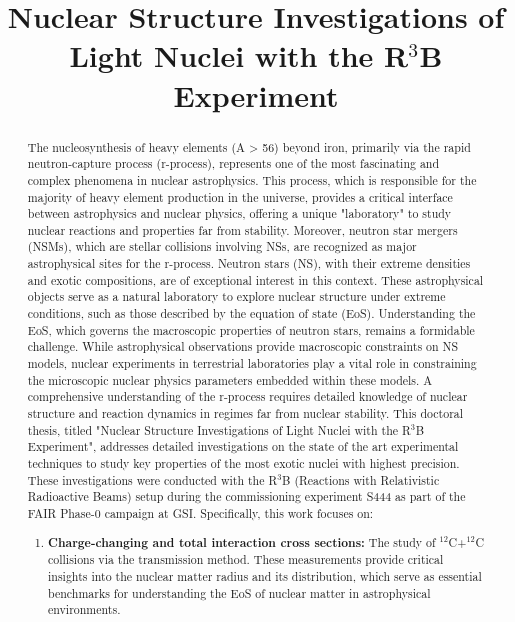 \documentclass[12pt, a4paper]{article}
\date{}
\title{\vspace{-5cm}Nuclear Structure Investigations of Light Nuclei with the R$^3$B Experiment}
\begin{document}
\maketitle

\begin{abstract}
The nucleosynthesis of heavy elements (A > 56) beyond iron, primarily via the rapid neutron-capture process (r-process), represents one of the most fascinating and complex phenomena in nuclear astrophysics. This process, which is responsible for the majority of heavy element production in the universe, provides a critical interface between astrophysics and nuclear physics, offering a unique "laboratory" to study nuclear reactions and properties far from stability. Moreover, neutron star mergers (NSMs), which are stellar collisions involving NSs, are recognized as major astrophysical sites for the r-process. Neutron stars (NS), with their extreme densities and exotic compositions, are of exceptional interest in this context. These astrophysical objects serve as a natural laboratory to explore nuclear structure under extreme conditions, such as those described by the equation of state (EoS). Understanding the EoS, which governs the macroscopic properties of neutron stars, remains a formidable challenge. While astrophysical observations provide macroscopic constraints on NS models, nuclear experiments in terrestrial laboratories play a vital role in constraining the microscopic nuclear physics parameters embedded within these models. A comprehensive understanding of the r-process requires detailed knowledge of nuclear structure and reaction dynamics in regimes far from nuclear stability.\newline
This doctoral thesis, titled "Nuclear Structure Investigations of Light Nuclei with the R$^3$B Experiment", addresses detailed investigations on the state of the art experimental techniques to study key properties of the most exotic nuclei with highest precision. These investigations were conducted with the R$^3$B (Reactions with Relativistic Radioactive Beams) setup during the commissioning experiment S444 as part of the FAIR Phase-0 campaign at GSI. Specifically, this work focuses on:
\begin{enumerate}
\item \textbf{Charge-changing and total interaction cross sections:} The study of $^{12}$C+$^{12}$C collisions via the transmission method. These measurements provide critical insights into the nuclear matter radius and its distribution, which serve as essential benchmarks for understanding the EoS of nuclear matter in astrophysical environments.

\end{enumerate}
\end{abstract}
\end{document}
